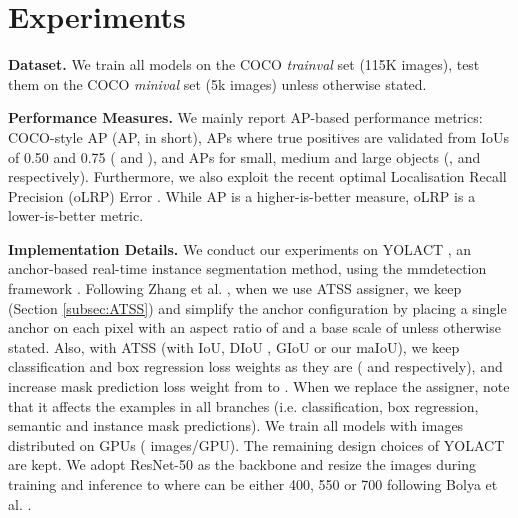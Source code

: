 \documentclass{bmvc2k}
\begin{document}
 \section{Experiments}
\label{sec:Experiments}

\noindent \textbf{Dataset.} We train all models on the COCO \textit{trainval} set \cite{COCO} (115K images), test them on the COCO \textit{minival} set (5k images) unless otherwise stated.

\noindent \textbf{Performance Measures.} We mainly report AP-based performance metrics: COCO-style AP (AP, in short), APs where true positives are validated from IoUs of 0.50 and 0.75 ( and ), and APs for small, medium and large objects (,  and  respectively). Furthermore, we also exploit the recent optimal Localisation Recall Precision (oLRP) Error \cite{LRP, LRParXiv}. While  AP is a  higher-is-better measure, oLRP is a lower-is-better metric.

\noindent \textbf{Implementation Details.} We conduct our experiments on YOLACT \cite{yolact}, an anchor-based real-time instance segmentation method, using the mmdetection framework \cite{mmdetection}. Following Zhang et al. \cite{ATSS}, when we use ATSS assigner, we keep  (Section \ref{subsec:ATSS}) and simplify the anchor configuration by placing a single anchor on each pixel with an aspect ratio of  and a base scale of  unless otherwise stated. Also, with ATSS (with IoU, DIoU \cite{DIoULoss}, GIoU \cite{GIoULoss} or our  maIoU), we keep classification and box regression loss weights as they are ( and  respectively), and increase mask prediction loss weight from  to . When we replace the assigner, note that it affects the examples in all branches (i.e. classification, box regression, semantic and instance mask predictions). We train all models with  images distributed on  GPUs ( images/GPU). The remaining design choices of YOLACT \cite{yolact} are kept. We adopt ResNet-50 \cite{ResNet} as the backbone and resize the images during training and inference to  where  can be either 400, 550 or 700 following Bolya et al. \cite{yolact}.
\end{document}
